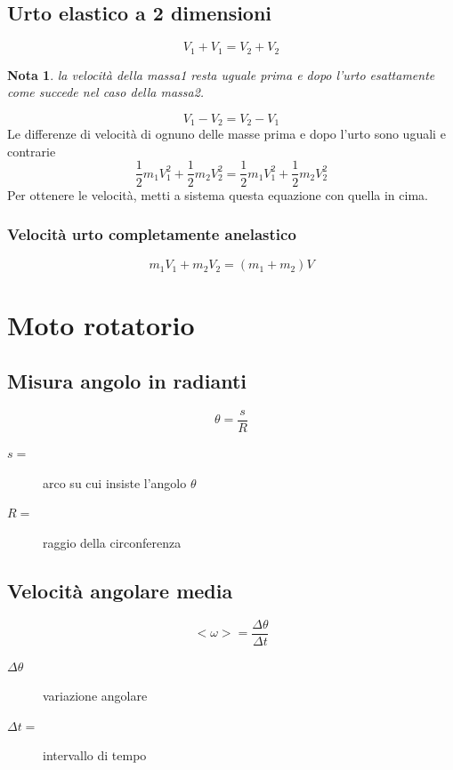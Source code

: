\documentclass{book}
\newtheorem{nota}{Nota}[section]
\begin{document}
\subsection{Urto elastico a 2 dimensioni}
\label{sec:urtela2dim}
\begin{equation}
  \label{eq:urtela2dim}
  V_1+V_1=V_2+V_2
\end{equation}
\begin{nota}
  la velocità della massa1 resta uguale prima e dopo l'urto esattamente come succede nel caso della massa2.
\end{nota}
\begin{equation}
  \label{eq:differenzatravel}
  V_1-V_2=V_2-V_1
\end{equation}
Le differenze di velocità di ognuno delle masse prima e dopo l'urto sono uguali e contrarie
\begin{equation*}
  \frac{1}{2}m_1V_1^2+\frac{1}{2}m_2V_2^2=\frac{1}{2}m_1V_1^2+\frac{1}{2}m_2V_2^2
\end{equation*}
Per ottenere le velocità, metti a sistema questa equazione con quella in cima.

\subsubsection{Velocità urto completamente anelastico}
\label{sec:velurtocompan}
\begin{equation}
  \label{eq:velurtcompan}
  m_1V_1+m_2V_2=(m_1+m_2)V
\end{equation}

\section{Moto rotatorio}
\label{sec:motorot}

\subsection{Misura angolo in radianti}
\label{sec:angrad}
\begin{equation}
  \label{eq:angrad}
  \theta = \frac{s}{R}
\end{equation}
\begin{description}
\item[$s=$] arco su cui insiste l'angolo $\theta$
\item[$R=$] raggio della circonferenza
\end{description}

\subsection{Velocità angolare media}
\label{sec:velangmedia}
\begin{equation}
  \label{eq:velangmedia}
  <\omega>=\frac{\Delta \theta}{\Delta t}
\end{equation}
\begin{description}
\item[$\Delta \theta$] variazione angolare
\item[$\Delta t=$] intervallo di tempo
\end{description}
\end{document}
